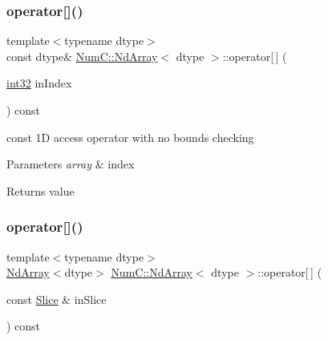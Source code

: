 \subsubsection{\texorpdfstring{operator[]()}{operator[]()}\hspace{0.1cm}{\footnotesize\ttfamily [2/3]}}
{\footnotesize\ttfamily template$<$typename dtype$>$ \\
const dtype\& \mbox{\hyperlink{class_num_c_1_1_nd_array}{Num\+C\+::\+Nd\+Array}}$<$ dtype $>$\+::operator\mbox{[}$\,$\mbox{]} (\begin{DoxyParamCaption}\item[{\mbox{\hyperlink{namespace_num_c_aa5a7e69266097d55816d4cdb19542b53}{int32}}}]{in\+Index }\end{DoxyParamCaption}) const\hspace{0.3cm}{\ttfamily [inline]}}

const 1D access operator with no bounds checking


\begin{DoxyParams}{Parameters}
{\em array} & index \\
\hline
\end{DoxyParams}
\begin{DoxyReturn}{Returns}
value 
\end{DoxyReturn}
\mbox{\label{class_num_c_1_1_nd_array_ae59cd422917912b1f58e66af33f7a5e2}} 
\subsubsection{\texorpdfstring{operator[]()}{operator[]()}\hspace{0.1cm}{\footnotesize\ttfamily [3/3]}}
{\footnotesize\ttfamily template$<$typename dtype$>$ \\
\mbox{\hyperlink{class_num_c_1_1_nd_array}{Nd\+Array}}$<$dtype$>$ \mbox{\hyperlink{class_num_c_1_1_nd_array}{Num\+C\+::\+Nd\+Array}}$<$ dtype $>$\+::operator\mbox{[}$\,$\mbox{]} (\begin{DoxyParamCaption}\item[{const \mbox{\hyperlink{class_num_c_1_1_slice}{Slice}} \&}]{in\+Slice }\end{DoxyParamCaption}) const\hspace{0.3cm}{\ttfamily [inline]}}

